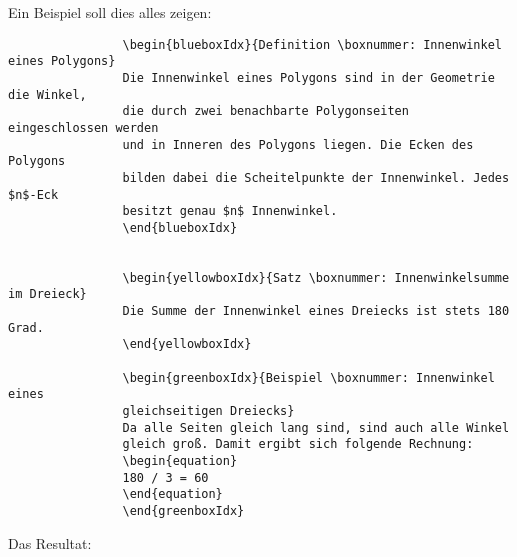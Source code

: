 				Ein Beispiel soll dies alles zeigen: \newline

				\begin{verbatim}
				\begin{blueboxIdx}{Definition \boxnummer: Innenwinkel eines Polygons}
				Die Innenwinkel eines Polygons sind in der Geometrie die Winkel,
				die durch zwei benachbarte Polygonseiten eingeschlossen werden
				und in Inneren des Polygons liegen. Die Ecken des Polygons
				bilden dabei die Scheitelpunkte der Innenwinkel. Jedes $n$-Eck
				besitzt genau $n$ Innenwinkel.
				\end{blueboxIdx}


				\begin{yellowboxIdx}{Satz \boxnummer: Innenwinkelsumme im Dreieck}
				Die Summe der Innenwinkel eines Dreiecks ist stets 180 Grad.
				\end{yellowboxIdx}

				\begin{greenboxIdx}{Beispiel \boxnummer: Innenwinkel eines
				gleichseitigen Dreiecks}
				Da alle Seiten gleich lang sind, sind auch alle Winkel
				gleich groß. Damit ergibt sich folgende Rechnung:
				\begin{equation}
				180 / 3 = 60
				\end{equation}
				\end{greenboxIdx}
				\end{verbatim}

				Das Resultat: \newline

				\newline

